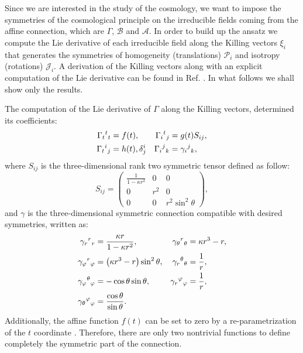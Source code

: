 Since we are interested in the study of the cosmology, we want to impose the symmetries of the cosmological principle on 
the irreducible fields coming from the affine connection, which are $\Gamma$, $\mathcal{B}$ and $\mathcal{A}$. 
In order to build up the ansatz we compute the Lie derivative of each irreducible field along the Killing vectors $\xi_i$ 
that generates the symmetries of homogeneity (translations) $\mathcal{P}_i$ and isotropy (rotations) $\mathcal{J}_i$. 
A derivation of the Killing vectors along with an explicit computation of the Lie derivative can be found 
in Ref. \cite{Castillo-Felisola17}. In what follows we shall show only the results.

The computation of the Lie derivative of $\Gamma$ along the Killing vectors, determined its coefficients: 
\begin{align}
    \label{G_ansatz}
    \Gamma_{t}{}^{ t}{}_{t} & =f(t), & \Gamma_{i}{}^{ t}{}_{j} & = g(t) S_{i j}, \\
    \Gamma_{t}{}^{ i}{}_{j} &= h(t), \delta^{i}_{j} & \Gamma_{i}{}^{ j}{}_{k} & = \gamma_{i}{}^{ j}{}_{k},
\end{align}
where $S_{ij}$ is the three-dimensional rank two symmetric tensor defined as follow:
\begin{equation*}
    S_{i j}=\left(\begin{array}{ccc}
    \frac{1}{1-\kappa r^2} & 0 & 0 \\
    0 & r^2 & 0 \\
    0 & 0 & r^2 \sin ^2 \theta
    \end{array}\right),
\end{equation*}
and $\gamma$ is the three-dimensional symmetric connection compatible with desired symmetries, written as:
\begin{align*}
    \gamma_{r}{}^{ r}{}_{r} & = \frac{\kappa r}{1 - \kappa r^2}, & \gamma_{\theta}{}^{ r}{}_{\theta} & = \kappa r^3 - r, \\
    \gamma_{\varphi}{}^{ r}{}_{\varphi} & = \left(\kappa r^3 - r\right)\sin^2\theta, & \gamma_{r}{}^{ \theta}{}_{\theta} & = \frac{1}{r}, \\
    \gamma_{\varphi}{}^{ \theta}{}_{\varphi} & = -\cos\theta\sin\theta, & \gamma_{r}{}^{ \varphi}{}_{\varphi} & = \frac{1}{r}, \\
    \gamma_{\theta}{}^{ \varphi}{}_{\varphi} & = \frac{\cos \theta}{\sin \theta}.
\end{align*}
Additionally, the affine function $f(t)$ can be set to zero by a re-parametrization of the $t$ coordinate \cite{Castillo_Felisola_2022_EPJC}. 
Therefore, there are only two nontrivial functions to define completely the symmetric part of the connection.

